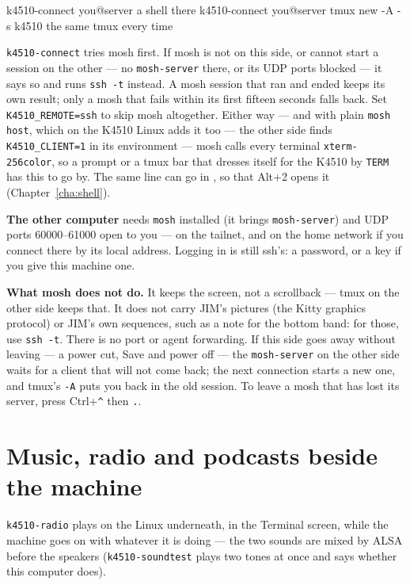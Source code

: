 \begin{type}
k4510-connect you@server                     a shell there
k4510-connect you@server tmux new -A -s k4510   the same tmux every time
\end{type}

\noindent \verb|k4510-connect| tries mosh first. If mosh is not on this
side, or cannot start a session on the other --- no \verb|mosh-server|
there, or its UDP ports blocked --- it says so and runs \verb|ssh -t|
instead. A mosh session that ran and ended keeps its own result; only a
mosh that fails within its first fifteen seconds falls back. Set
\verb|K4510_REMOTE=ssh| to skip mosh altogether. Either way --- and with plain \verb|mosh host|, which on the K4510 Linux
adds it too --- the other side finds
\verb|K4510_CLIENT=1| in its environment --- mosh calls every terminal
\verb|xterm-256color|, so a prompt or a tmux bar that dresses itself for
the K4510 by \verb|TERM| has this to go by. The same line can go in
, so that Alt+2 opens it
(Chapter~\ref{cha:shell}).

\textbf{The other computer} needs \verb|mosh| installed (it brings
\verb|mosh-server|) and UDP ports 60000--61000 open to you --- on the
tailnet, and on the home network if you connect there by its local
address. Logging in is still ssh's: a password, or a key if you give this
machine one.

\textbf{What mosh does not do.} It keeps the screen, not a scrollback
--- tmux on the other side keeps that. It does not carry JIM's pictures
(the Kitty graphics protocol) or JIM's own sequences, such as a note for
the bottom band: for those, use \verb|ssh -t|. There is no port or
agent forwarding. If this side goes away without leaving --- a power
cut, Save and power off --- the \verb|mosh-server| on the other side
waits for a client that will not come back; the next connection starts a
new one, and tmux's \verb|-A| puts you back in the old session. To leave
a mosh that has lost its server, press Ctrl+\verb|^| then \verb|.|.

\section{Music, radio and podcasts beside the machine}
\verb|k4510-radio| plays on the Linux underneath, in the Terminal screen,
while the machine goes on with whatever it is doing --- the two sounds are
mixed by ALSA before the speakers (\verb|k4510-soundtest| plays two tones
at once and says whether this computer does).

